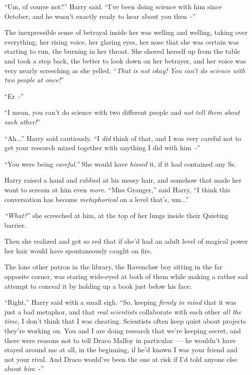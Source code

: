 ``Um, of course not?'' Harry said. ``I've been doing science with him since October, and he wasn't exactly ready to hear about you then~-''

The inexpressible sense of betrayal inside her was welling and welling, taking over everything, her rising voice, her glaring eyes, her nose that she was certain was starting to run, the burning in her throat. She shoved herself up from the table and took a step back, the better to look down on her betrayer, and her voice was very nearly screeching as she yelled, ``\emph{That is not okay! You can't do science with two people at once!}''

``Er~-''

``I mean, you can't do science with two different people and \emph{not tell them about each other!}''

``Ah...'' Harry said cautiously. ``I \emph{did} think of that, and I was very careful not to get your research mixed together with anything I did with him~-''

``You were being \emph{careful.''} She would have \emph{hissed} it, if it had contained any Ss.

Harry raised a hand and rubbed at his messy hair, and somehow that made her want to scream at him even \emph{more.} ``Miss Granger,'' said Harry, ``I think this conversation has become \emph{metaphorical} on a level that's, um...''

\emph{``What?}'' she screeched at him, at the top of her lungs inside their Quieting barrier.

Then she realized and got so red that if she'd had an adult level of magical power her hair would have spontaneously caught on fire.

The lone other patron in the library, the Ravenclaw boy sitting in the far opposite corner, was staring wide-eyed at both of them while making a rather sad attempt to conceal it by holding up a book just below his face.

``Right,'' Harry said with a small sigh. ``So, keeping \emph{firmly in mind} that it was just a bad metaphor, and that \emph{real scientists} collaborate with each other \emph{all the time,} I don't think that I was cheating. Scientists often keep quiet about projects they're working on. You and I are doing research that we're keeping secret, and there were reasons not to tell Draco Malfoy in particular~--- he wouldn't have stayed around me at all, in the beginning, if he'd known I was your friend and not your rival. And Draco would've been the one at risk if I'd told anyone else about \emph{him}~-''

